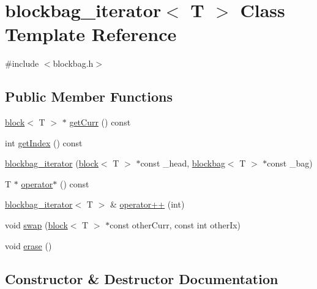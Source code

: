 \hypertarget{classblockbag__iterator}{}\section{blockbag\+\_\+iterator$<$ T $>$ Class Template Reference}
\label{classblockbag__iterator}


{\ttfamily \#include $<$blockbag.\+h$>$}

\subsection*{Public Member Functions}
\begin{DoxyCompactItemize}
\item 
\hyperlink{classblock}{block}$<$ T $>$ $\ast$ \hyperlink{classblockbag__iterator_aa99d991d209d80cbdb27309d6cfb8efa}{get\+Curr} () const
\item 
int \hyperlink{classblockbag__iterator_a6c1d126ebb9bb7c5d32366f18e8ed83d}{get\+Index} () const
\item 
\hyperlink{classblockbag__iterator_a7ef4ae857fb7b5be23f7a4b074846417}{blockbag\+\_\+iterator} (\hyperlink{classblock}{block}$<$ T $>$ $\ast$const \+\_\+head, \hyperlink{classblockbag}{blockbag}$<$ T $>$ $\ast$const \+\_\+bag)
\item 
T $\ast$ \hyperlink{classblockbag__iterator_a4c44f3c7850d4548e4be02745c82fbed}{operator$\ast$} () const
\item 
\hyperlink{classblockbag__iterator}{blockbag\+\_\+iterator}$<$ T $>$ \& \hyperlink{classblockbag__iterator_a37c398b44de81928b694f808e6347eab}{operator++} (int)
\item 
void \hyperlink{classblockbag__iterator_a15dd4b935345d01a0bed723155010f74}{swap} (\hyperlink{classblock}{block}$<$ T $>$ $\ast$const other\+Curr, const int other\+Ix)
\item 
void \hyperlink{classblockbag__iterator_ab23a01d4163d17774780893a01a76ae5}{erase} ()
\end{DoxyCompactItemize}


\subsection{Constructor \& Destructor Documentation}
\mbox{\label{classblockbag__iterator_a7ef4ae857fb7b5be23f7a4b074846417}} 
